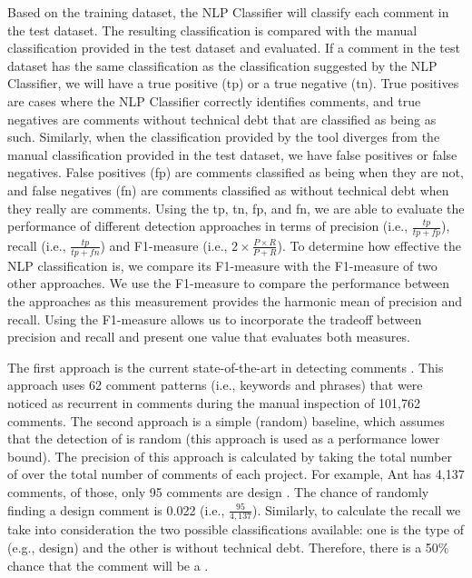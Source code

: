 Based on the training dataset, the NLP Classifier will classify each comment in the test dataset. The resulting classification is compared with the manual classification provided in the test dataset and evaluated. If a comment in the test dataset has the same classification as the classification suggested by the NLP Classifier, we will have a true positive (tp) or a true negative (tn). True positives are cases where the NLP Classifier correctly identifies \SATD comments, and true negatives are comments without technical debt that are classified as being as such. Similarly, when the classification provided by the tool diverges from the manual classification provided in the test dataset, we have false positives or false negatives. False positives (fp) are comments classified as being \SATD when they are not, and false negatives (fn) are comments classified as without technical debt when they really are \SATD comments. Using the tp, tn, fp, and fn, we are able to evaluate the performance of different detection approaches in terms of precision (i.e., $\frac{tp}{tp + fp}$), recall (i.e., $\frac{tp}{tp + fn}$) and F1-measure (i.e., $2 \times \frac{P \times R}{P + R}$). To determine how effective the NLP classification is, we compare its F1-measure with the F1-measure of two other approaches. We use the F1-measure to compare the performance between the approaches as this measurement provides the harmonic mean of precision and recall. Using the F1-measure allows us to incorporate the tradeoff between precision and recall and present one value that evaluates both measures.

The first approach is the current state-of-the-art in detecting \SATD comments . This approach uses 62 comment patterns (i.e., keywords and phrases) that were noticed as recurrent in \SATD comments during the manual inspection of 101,762 comments. The second approach is a simple (random) baseline, which assumes that the detection of \SATD is random (this approach is used as a performance lower bound). The precision of this approach is calculated by taking the total number of \SATD over the total number of comments of each project. For example, Ant has 4,137 comments, of those, only 95 comments are design \SATD. The chance of randomly finding a design \SATD comment is 0.022 (i.e., $\frac{95}{4,137}$). Similarly, to calculate the recall we take into consideration the two possible classifications available: one is the type of \SATD (e.g., design) and the other is without technical debt. Therefore, there is a 50\% chance that the comment will be a \SATD. 


